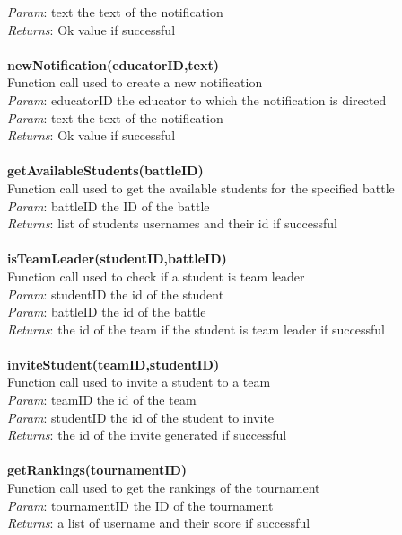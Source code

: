 \documentclass{article}
\begin{document}
\textit{Param}: text the text of the notification\\
\textit{Returns}: Ok value if successful\\
\\
\textbf{newNotification(educatorID,text)}\\
Function call used to create a new notification\\
\textit{Param}: educatorID the educator to which the notification is directed\\
\textit{Param}: text the text of the notification\\
\textit{Returns}: Ok value if successful\\
\\
\textbf{getAvailableStudents(battleID)}\\
Function call used to get the available students for the specified battle\\
\textit{Param}: battleID the ID of the battle\\
\textit{Returns}: list of students usernames and their id if successful\\
\\
\textbf{isTeamLeader(studentID,battleID)}\\
Function call used to check if a student is team leader\\
\textit{Param}: studentID the id of the student\\
\textit{Param}: battleID the id of the battle\\
\textit{Returns}: the id of the team if the student is team leader if successful\\
\\
\textbf{inviteStudent(teamID,studentID)}\\
Function call used to invite a student to a team\\
\textit{Param}: teamID the id of the team\\
\textit{Param}: studentID the id of the student to invite\\
\textit{Returns}: the id of the invite generated if successful\\
\\
\textbf{getRankings(tournamentID)}\\
Function call used to get the rankings of the tournament\\
\textit{Param}: tournamentID the ID of the tournament\\
\textit{Returns}: a list of username and their score if successful\\
\\
\end{document}
